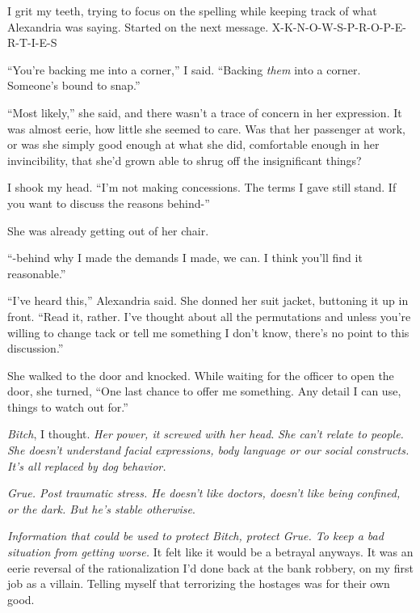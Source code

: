 I grit my teeth, trying to focus on the spelling while keeping track of what Alexandria was saying.  Started on the next message.  X-K-N-O-W-S-P-R-O-P-E-R-T-I-E-S



``You're backing me into a corner,'' I said.  ``Backing \emph{them} into a corner.  Someone's bound to snap.''



``Most likely,'' she said, and there wasn't a trace of concern in her expression.  It was almost eerie, how little she seemed to care.  Was that her passenger at work, or was she simply good enough at what she did, comfortable enough in her invincibility, that she'd grown able to shrug off the insignificant things?



I shook my head.  ``I'm not making concessions.  The terms I gave still stand.  If you want to discuss the reasons behind-''



She was already getting out of her chair.



``-behind why I made the demands I made, we can.  I think you'll find it reasonable.''



``I've heard this,'' Alexandria said.  She donned her suit jacket, buttoning it up in front.  ``Read it, rather.  I've thought about all the permutations and unless you're willing to change tack or tell me something I don't know, there's no point to this discussion.''



She walked to the door and knocked.  While waiting for the officer to open the door, she turned, ``One last chance to offer me something.  Any detail I can use, things to watch out for.''



\emph{Bitch}, I thought.  \emph{Her power, it screwed with her head}.  \emph{She can't relate to people.  She doesn't understand facial expressions, body language or our social constructs.  It's all replaced by dog behavior. }



\emph{Grue.  Post traumatic stress.  He doesn't like doctors, doesn't like being confined, or the dark.  But he's stable otherwise}.



\emph{Information that could be used to protect Bitch, protect Grue.  To keep a bad situation from getting worse.  }It felt like it would be a betrayal anyways.  It was an eerie reversal of the rationalization I'd done back at the bank robbery, on my first job as a villain.  Telling myself that terrorizing the hostages was for their own good.



